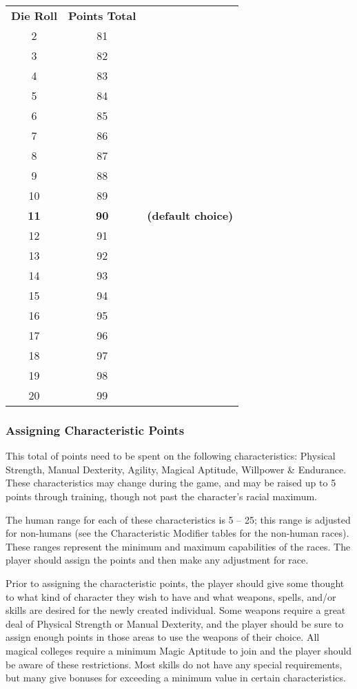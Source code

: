 \begin{multicols*}{3}
\begin{tabular}{ccl}
\textbf{Die Roll} & \textbf{Points Total} \\
2	& 81 \\
3	& 82 \\
4	& 83 \\
5	& 84 \\
6	& 85 \\
7	& 86 \\
8	& 87 \\
9	& 88 \\
10	& 89 \\
\textbf{11} & \textbf{90} & \textbf{(default choice)} \\
12	& 91 \\
13	& 92 \\
14	& 93 \\
15	& 94 \\
16	& 95 \\
17	& 96 \\
18	& 97 \\
19	& 98 \\
20	& 99 \\
\end{tabular}

\subsubsection{Assigning Characteristic Points}

This total of points need to be spent on the following
characteristics: Physical Strength, Manual Dexterity, Agility, Magical
Aptitude, Willpower \& Endurance. These characteristics may change
during the game, and may be raised up to 5 points through training,
though not past the character's racial maximum.

The human range for each of these characteristics is 5 -- 25; this
range is adjusted for non-humans (see the Characteristic Modifier
tables for the non-human races). These ranges represent the minimum
and maximum capabilities of the races. The player should assign the
points and then make any adjustment for race.

Prior to assigning the characteristic points, the player should give
some thought to what kind of character they wish to have and what
weapons, spells, and/or skills are desired for the newly created
individual. Some weapons require a great deal of Physical Strength or
Manual Dexterity, and the player should be sure to assign enough
points in those areas to use the weapons of their choice. All magical
colleges require a minimum Magic Aptitude to join and the player
should be aware of these restrictions. Most skills do not have any
special requirements, but many give bonuses for exceeding a minimum
value in certain characteristics.


\end{multicols*}
